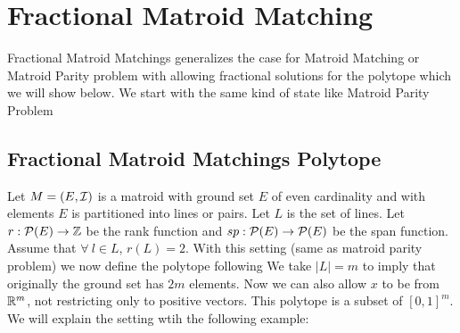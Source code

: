 \chapter{Fractional Matroid Matching}\label{fractional-matroid-matching}
Fractional Matroid Matchings generalizes the case for Matroid Matching or Matroid Parity problem with allowing fractional solutions for the polytope which we will show below. We start with the same kind of state like Matroid Parity Problem
\section{Fractional Matroid Matchings Polytope}
Let $M=(E,\mathcal{I})$ is a matroid  with ground set $E$ of even cardinality and with elements $E$ is partitioned  into lines or pairs. Let $L$ is the  set of lines.  Let $r:\mathcal{P}(E)\to \mathbb{Z}$ be the rank function and $sp:\mathcal{P}(E)\to \mathcal{P}(E)$ be the span function. Assume that $\forall\ l\in L$, $r(L)=2$. With this setting (same as matroid parity problem) we now define the polytope following \cite{VandeVate_1992_Fmm}
We take $|L|=m$ to imply that originally the ground set has $2m$ elements. Now we can also allow $x$ to be from $\mathbb{R}^{m}$, not restricting only to positive vectors. This polytope is a subset of $[0,1]^m$. We will explain the setting wtih the following example:
